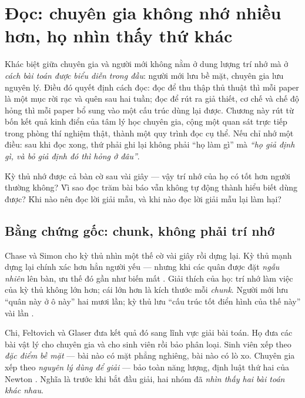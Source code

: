 \documentclass[../hieu-suat.tex]{subfiles}
\begin{document}
\chapter{Đọc: chuyên gia không nhớ nhiều hơn, họ nhìn thấy thứ khác}

\begin{tomtat}
Khác biệt giữa chuyên gia và người mới không nằm ở dung lượng trí nhớ mà ở \emph{cách bài toán được biểu diễn trong đầu}: người mới lưu bề mặt, chuyên gia lưu nguyên lý. Điều đó quyết định cách đọc: đọc để thu thập thủ thuật thì mỗi paper là một mục rời rạc và quên sau hai tuần; đọc để rút ra giả thiết, cơ chế và chế độ hỏng thì mỗi paper bổ sung vào một cấu trúc dùng lại được. Chương này rút từ bốn kết quả kinh điển của tâm lý học chuyên gia, cộng một quan sát trực tiếp trong phòng thí nghiệm thật, thành một quy trình đọc cụ thể. Nếu chỉ nhớ một điều: sau khi đọc xong, thứ phải ghi lại không phải ``họ làm gì'' mà \emph{``họ giả định gì, và bỏ giả định đó thì hỏng ở đâu''}.
\end{tomtat}

\begin{khoigoi}
\h{Kỳ thủ nhớ được cả bàn cờ sau vài giây --- vậy trí nhớ của họ có tốt hơn người thường không?}
\h{Vì sao đọc trăm bài báo vẫn không tự động thành hiểu biết dùng được?}
\h{Khi nào nên đọc lời giải mẫu, và khi nào đọc lời giải mẫu lại làm hại?}
\end{khoigoi}

\section{Bằng chứng gốc: chunk, không phải trí nhớ}

Chase và Simon \cite{chase1973} cho kỳ thủ nhìn một thế cờ vài giây rồi dựng lại. Kỳ thủ mạnh dựng lại chính xác hơn hẳn người yếu --- nhưng khi các quân được đặt \emph{ngẫu nhiên} lên bàn, ưu thế đó gần như biến mất \nD{}. Giải thích của họ: trí nhớ làm việc của kỳ thủ không lớn hơn; cái lớn hơn là kích thước mỗi \emph{chunk}. Người mới lưu ``quân này ở ô này'' hai mươi lần; kỳ thủ lưu ``cấu trúc tốt điển hình của thế này'' vài lần \nT{}.

Chi, Feltovich và Glaser \cite{chi1981} đưa kết quả đó sang lĩnh vực giải bài toán. Họ đưa các bài vật lý cho chuyên gia và cho sinh viên rồi bảo phân loại. Sinh viên xếp theo \emph{đặc điểm bề mặt} --- bài nào có mặt phẳng nghiêng, bài nào có lò xo. Chuyên gia xếp theo \emph{nguyên lý dùng để giải} --- bảo toàn năng lượng, định luật thứ hai của Newton \nD{}. Nghĩa là trước khi bắt đầu giải, hai nhóm đã \emph{nhìn thấy hai bài toán khác nhau}.
\end{document}
